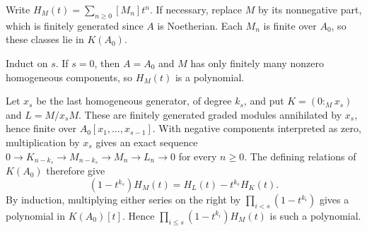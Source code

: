 Write $H_M(t)=\sum_{n\geq0}[M_n]t^n$. If necessary, replace $M$ by its nonnegative part, which is finitely generated since $A$ is Noetherian. Each $M_n$ is finite over $A_0$, so these classes lie in $K(A_0)$.

Induct on $s$. If $s=0$, then $A=A_0$ and $M$ has only finitely many nonzero homogeneous components, so $H_M(t)$ is a polynomial.

Let $x_s$ be the last homogeneous generator, of degree $k_s$, and put $K=(0:_M x_s)$ and $L=M/x_sM$. These are finitely generated graded modules annihilated by $x_s$, hence finite over $A_0[x_1,\ldots,x_{s-1}]$. With negative components interpreted as zero, multiplication by $x_s$ gives an exact sequence $0\to K_{n-k_s}\to M_{n-k_s}\to M_n\to L_n\to0$ for every $n\geq0$. The defining relations of $K(A_0)$ therefore give
\[(1-t^{k_s})H_M(t)=H_L(t)-t^{k_s}H_K(t).\]
By induction, multiplying either series on the right by $\prod_{i<s}(1-t^{k_i})$ gives a polynomial in $K(A_0)[t]$. Hence $\prod_{i\leq s}(1-t^{k_i})H_M(t)$ is such a polynomial.
